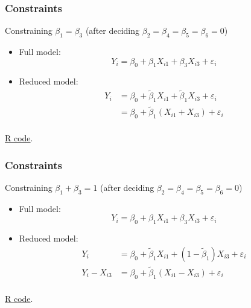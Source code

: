 \documentclass[handout]{beamer}
\begin{document}
   \begin{frame} \frametitle{Constraints}

   \begin{block}
   {Constraining $\beta_1=\beta_3$ (after deciding $\beta_2=\beta_4=\beta_5=\beta_6=0$)}
   \begin{itemize}
   \item Full model:
   $$
   Y_i = \beta_0 + \beta_1 X_{i1}  + \beta_3 X_{i3} + \varepsilon_i
   $$

   \item Reduced model:
   $$
   \begin{aligned}
   Y_i &= \beta_0 + \tilde{\beta}_1 X_{i1}  + \tilde{\beta}_1 X_{i3} + \varepsilon_i \\
   &= \beta_0 + \tilde{\beta}_1 (X_{i1}  + X_{i3}) + \varepsilon_i \\
   \end{aligned}
   $$
   \end{itemize}
   \href{http://stats191.stanford.edu/multiple.html}{R code}.

   \end{block}
   \end{frame}


   \begin{frame} \frametitle{Constraints}

   \begin{block}
   {Constraining $\beta_1+\beta_3=1$ (after deciding $\beta_2=\beta_4=\beta_5=\beta_6=0$)}
   \begin{itemize}
   \item Full model:
   $$
   Y_i = \beta_0 + \beta_1 X_{i1}  + \beta_3 X_{i3} + \varepsilon_i
   $$

   \item Reduced model:
   $$
   \begin{aligned}
   Y_i &= \beta_0 + \tilde{\beta}_1 X_{i1}  + (1 - \tilde{\beta}_1) X_{i3} + \varepsilon_i \\
   Y_i - X_{i3} &= \beta_0 + \tilde{\beta}_1 (X_{i1}  - X_{i3}) + \varepsilon_i \\
   \end{aligned}
   $$
   \end{itemize}
   \href{http://stats191.stanford.edu/multiple.html}{R code}.

   \end{block}
   \end{frame}
\end{document}
